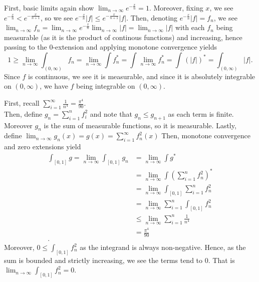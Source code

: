 \documentclass[a4paper]{article}
\begin{document}
\newpage
\begin{problem}[34]
	First, basic limits again show \(\lim_{n \to \infty}e^{-\frac{x}{n}} = 1\). Moreover, fixing \(x\), we see \(e^{-\frac{x}{n}} < e^{-\frac{x}{n+1}}\), so we see \(e^{-\frac{x}{n}}\left| f \right| \le e^{-\frac{x}{n+1}}\left| f \right| \). Then, denoting \(e^{-\frac{x}{n}}\left| f \right| = f_{n}\), we see \(\lim_{n \to \infty}f_{n} = \lim_{n \to \infty}e^{-\frac{x}{n}} \lim_{n \to \infty}\left| f \right| = \lim_{n \to \infty}\left| f \right| \) with each \(f_{n}\) being measurable (as it is the product of continous functions) and increasing, hence passing to the \(0\)-extension and applying monotone convergence yields \[
	1 \ge \lim_{n \to \infty}\int_{\left( 0, \infty \right) } f_{n} = \lim_{n \to \infty} \int f_{n}^{*} =  \int_{ } \lim_{n \to \infty}f_{n}^{*} = \int_{} (\left| f \right|)^{*} = \int_{\left( 0, \infty \right) } \left| f \right|
	.\]
	Since \(f\) is continuous, we see it is measurable, and since it is absolutely integrable on \(\left( 0, \infty \right) \), we have \(f\) being integrable on \(\left( 0, \infty \right) \).
\end{problem}
\newpage
\begin{problem}[35]
	First, recall \(\sum_{i= 1}^{\infty} \frac{1}{n^{4} } = \frac{\pi^{4}}{90}\).\\
	Then, define \(g_{n} = \sum_{i= 1}^{n} f_{i}^2\) and note that \(g_{n} \le g_{n+1}\) as each term is finite. Moreover \(g_{n}\) is the sum of measurable functions, so it is measurable. Lastly, define \(\lim_{n \to \infty}g_{n}\left( x \right) = g\left( x \right)  = \sum_{i= 1}^{\infty} f_{n}^2\left( x \right) \) Then, monotone convergence  and zero extensions yield
	\begin{align*}
		\int_{\left[ 0, 1 \right] } g = \lim_{n \to \infty} \int_{\left[ 0, 1 \right] }g_{n}
		&= \lim_{n \to \infty}\int g^{*} \\
		&= \lim_{n \to \infty} \int (\sum_{i= 1}^{n} f_{n}^2)^{*} \\
		&= \lim_{n \to \infty} \int_{\left[ 0, 1 \right] } \sum_{i= 1}^{n} f_{n}^2 \\
		&= \lim_{n \to \infty} \sum_{i= 1}^{n} \int_{\left[ 0, 1 \right] }f_{n}^2 \\
		&\le \lim_{n \to \infty} \sum_{i= 1}^{n} \frac{1}{n^{4}} \\
		&= \frac{\pi^{4}}{90} \\
	.\end{align*}
	Moreover, \(0 \le \int_{\left[ 0, 1 \right] }f_{n}^2\) as the integrand is always non-negative. Hence, as the sum is bounded and strictly increasing, we see the terms tend to \(0\). That is \( \lim_{n \to \infty} \int _{\left[ 0, 1 \right] }f_{n}^2 = 0\).
\end{problem}
\end{document}
